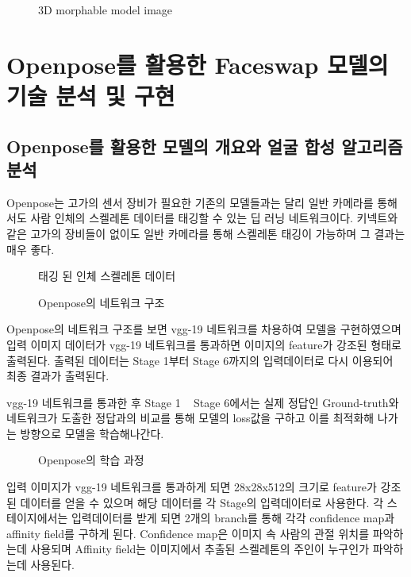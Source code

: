 \documentclass{oblivoir}
\begin{document}
\begin{figure}[h!]
\centering
\caption{ 3D morphable model image\cite{reference7}}
\end{figure}



\chapter{Openpose를 활용한 Faceswap 모델의 기술 분석 및 구현}

\section{Openpose를 활용한 모델의 개요와 얼굴 합성 알고리즘 분석}

Openpose는 고가의 센서 장비가 필요한 기존의 모델들과는 달리 일반 카메라를 통해서도 사람 인체의 스켈레톤 데이터를 태깅할 수 있는 딥 러닝 네트워크이다. 키넥트와 같은 고가의 장비들이 없이도 일반 카메라를 통해 스켈레톤 태깅이 가능하며 그 결과는 매우 좋다.

\begin{figure}[h!]
\centering
\caption{태깅 된 인체 스켈레톤 데이터}
\end{figure}

\begin{figure}[h!]
\centering
\caption{Openpose의 네트워크 구조\cite{reference10}}
\end{figure}


Openpose의 네트워크 구조를 보면 vgg-19 네트워크를 차용하여 모델을 구현하였으며 입력 이미지 데이터가 vgg-19 네트워크를 통과하면 이미지의 feature가 강조된 형태로 출력된다. 출력된 데이터는 Stage 1부터 Stage 6까지의 입력데이터로 다시 이용되어 최종 결과가 출력된다.

vgg-19 네트워크를 통과한 후 Stage 1 ~ Stage 6에서는 실제 정답인 Ground-truth와 네트워크가 도출한 정답과의 비교를 통해 모델의 loss값을 구하고 이를 최적화해 나가는 방향으로 모델을 학습해나간다.

\begin{figure}[h!]
\centering
\caption{Openpose의 학습 과정\cite{reference10}}
\end{figure}


입력 이미지가 vgg-19 네트워크를 통과하게 되면 28x28x512의 크기로 feature가 강조된 데이터를 얻을 수 있으며 해당 데이터를 각 Stage의 입력데이터로 사용한다. 각 스테이지에서는 입력데이터를 받게 되면 2개의 branch를 통해 각각 confidence map과 affinity field를 구하게 된다. Confidence map은 이미지 속 사람의 관절 위치를 파악하는데 사용되며 Affinity field는 이미지에서 추출된 스켈레톤의 주인이 누구인가 파악하는데 사용된다.
\end{document}

